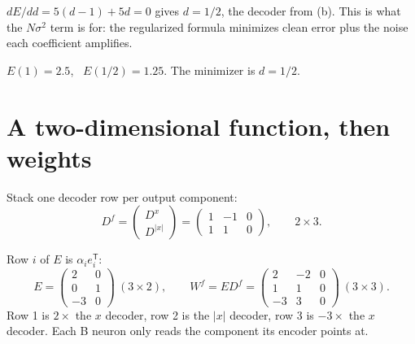 \documentclass[11pt,letterpaper]{article}
\newcommand{\T}{\mathsf T}
\newcommand{\ans}[1]{\par\vspace{4pt}{\bfseries #1}\quad}
\begin{document}
\ans{(d)}
$dE/dd = 5(d - 1) + 5d = 0$ gives $d = 1/2$, the decoder from (b). This is what the $N\sigma^2$ term is for: the regularized formula minimizes clean error plus the noise each coefficient amplifies.
\begin{center}
\end{center}
\begin{result}
$E(1) = 2.5$, \ $E(1/2) = 1.25$. The minimizer is $d = 1/2$.
\end{result}

\section{A two-dimensional function, then weights}

\ans{(a)}
Stack one decoder row per output component:
\[
D^f = \begin{pmatrix} D^x \\ D^{|x|} \end{pmatrix} = \begin{pmatrix} 1 & -1 & 0 \\ 1 & 1 & 0 \end{pmatrix}, \qquad 2 \times 3 .
\]

\ans{(b)}
Row $i$ of $E$ is $\alpha_i e_i^\T$:
\[
E = \begin{pmatrix} 2 & 0 \\ 0 & 1 \\ -3 & 0 \end{pmatrix}\ (3 \times 2), \qquad
W^f = E D^f = \begin{pmatrix} 2 & -2 & 0 \\ 1 & 1 & 0 \\ -3 & 3 & 0 \end{pmatrix}\ (3 \times 3).
\]
Row 1 is $2\times$ the $x$ decoder, row 2 is the $|x|$ decoder, row 3 is $-3\times$ the $x$ decoder. Each B neuron only reads the component its encoder points at.
\end{document}
